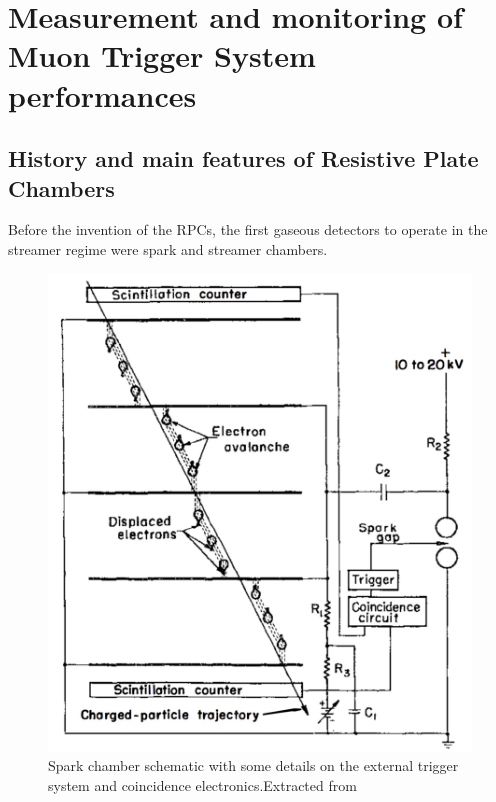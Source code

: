 \chapter{Measurement and monitoring of Muon Trigger System performances}

\section{History and main features of Resistive Plate Chambers}
Before the invention of the RPCs, the first gaseous detectors to operate in the streamer regime were spark and streamer chambers.

\begin{figure}[!t]
\begin{center}
\includegraphics[width=0.95\linewidth]{Chapters/Performance/Figs/spark-chambers.pdf}
\caption{Spark chamber schematic with some details on the external trigger system and coincidence electronics.Extracted from \cite{wenzel:1966}}
\label{fig:SparkChamber}
\end{center}
\end{figure}

